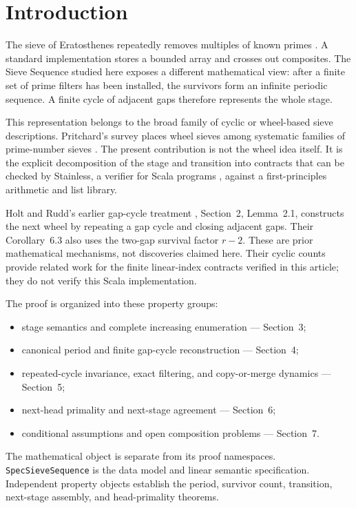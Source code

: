 \section{Introduction}
\label{sec:introduction}

The sieve of Eratosthenes repeatedly removes multiples of known primes
\cite{hardywright1979}. A standard implementation stores a bounded array
and crosses out composites. The Sieve Sequence studied here exposes a
different mathematical view: after a finite set of prime filters has been
installed, the survivors form an infinite periodic sequence. A finite
cycle of adjacent gaps therefore represents the whole stage.

This representation belongs to the broad family of cyclic or wheel-based
sieve descriptions. Pritchard's survey places wheel sieves among
systematic families of prime-number sieves \cite{pritchard1987}. The
present contribution is not the wheel idea itself. It is the explicit
decomposition of the stage and transition into contracts that can be
checked by Stainless, a verifier for Scala programs
\cite{stainless2024verification}, against a first-principles arithmetic
and list library.

Holt and Rudd's earlier gap-cycle treatment \cite{holtrudd2014}, Section~2,
Lemma~2.1, constructs the next wheel by repeating a gap cycle and closing
adjacent gaps. Their Corollary~6.3 also uses the two-gap survival factor
$r-2$. These are prior mathematical mechanisms, not discoveries claimed
here. Their cyclic counts provide related work for the finite linear-index
contracts verified in this article; they do not verify this Scala implementation.

The proof is organized into these property groups:

\begin{itemize}
  \item stage semantics and complete increasing enumeration --- Section~3;
  \item canonical period and finite gap-cycle reconstruction --- Section~4;
  \item repeated-cycle invariance, exact filtering, and copy-or-merge
    dynamics --- Section~5;
  \item next-head primality and next-stage agreement --- Section~6;
  \item conditional assumptions and open composition problems ---
    Section~7.
\end{itemize}

The mathematical object is separate from its proof namespaces.
\texttt{SpecSieveSequence} is the data model and linear semantic
specification. Independent property objects establish the period,
survivor count, transition, next-stage assembly, and head-primality
theorems.
